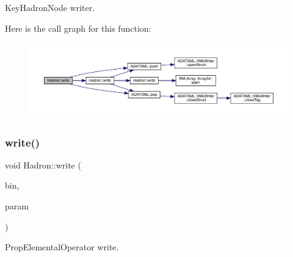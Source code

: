Key\+Hadron\+Node writer. 

Here is the call graph for this function\+:
\nopagebreak
\begin{figure}[H]
\begin{center}
\leavevmode
\includegraphics[width=350pt]{d1/daf/namespaceHadron_aa7f9575393c93afa7db5f164da5c31eb_cgraph}
\end{center}
\end{figure}
\mbox{\label{namespaceHadron_a4e777dd6c1ccf60b80a383fd5901627b}} 
\subsubsection{\texorpdfstring{write()}{write()}\hspace{0.1cm}{\footnotesize\ttfamily [67/95]}}
{\footnotesize\ttfamily void Hadron\+::write (\begin{DoxyParamCaption}\item[{\mbox{\hyperlink{classADATIO_1_1BinaryWriter}{Binary\+Writer}} \&}]{bin,  }\item[{const \mbox{\hyperlink{structHadron_1_1ValPropElementalOperator__t}{Val\+Prop\+Elemental\+Operator\+\_\+t}} \&}]{param }\end{DoxyParamCaption})}



Prop\+Elemental\+Operator write. 

